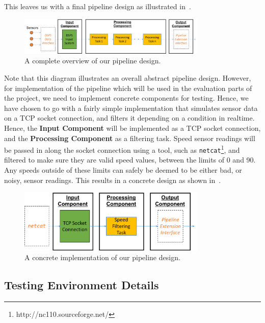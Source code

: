 This leaves us with a final pipeline design as illustrated in~.

\begin{figure}[h]
  \centering
  \includegraphics[width=0.8\textwidth]{includes/figures/fig_pipeline_whole}
  \caption{A complete overview of our pipeline design.}
  \label{fig:pipeline_whole}
\end{figure}

Note that this diagram illustrates an overall abstract pipeline design. However, for implementation of the pipeline which
will be used in the evaluation parts of the project, we need to implement concrete components for testing. Hence, we
have chosen to go with a fairly simple implementation that simulates sensor data on a TCP socket connection, and filters
it depending on a condition in realtime. Hence, the \textbf{Input Component} will be implemented as a TCP socket connection,
and the \textbf{Processing Component} as a filtering task. Speed sensor readings will be passed in along the socket connection
using a tool, such as \texttt{netcat}\footnote{http://nc110.sourceforge.net/}, and filtered to make sure they are valid
speed values, between the limits of 0 and 90. Any speeds
outside of these limits can safely be deemed to be either bad, or noisy, sensor readings. This results in a concrete design as shown
in~.

\begin{figure}[h]
  \centering
  \includegraphics[width=0.8\textwidth]{includes/figures/fig_pipeline_concrete}
  \caption{A concrete implementation of our pipeline design.}
  \label{fig:pipeline_concrete}
\end{figure}



\subsection{Testing Environment Details} %
\label{sub:testing_environment_details}

